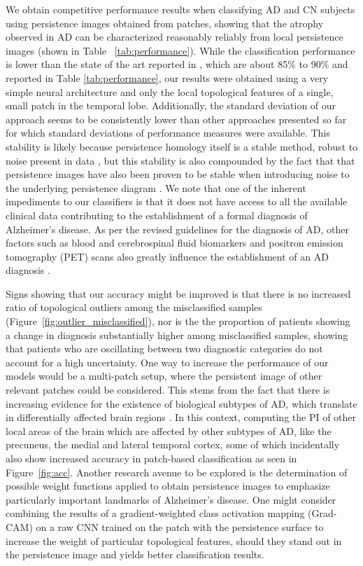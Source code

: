 \documentclass{article}
\begin{document}
We obtain competitive performance results when classifying AD and CN subjects using persistence
images obtained from patches, showing that the atrophy observed in AD can be characterized
reasonably reliably from local persistence images (shown in Table ~\ref{tab:performance}). While the
classification performance is lower than the state of the art reported in \citep{liu2018anatomical},
which are about 85\% to 90\% and reported in Table \ref{tab:performance}, our results were obtained
using a very simple neural architecture and only the local topological features of a single, small
patch in the temporal lobe. Additionally, the standard deviation of our approach seems to be
consistently lower than other approaches presented so far for which standard deviations of
performance measures were available. This stability is likely because persistence
homology itself is a stable method, robust to noise present in data \citep{cohen2007stability},
but this stability is also compounded by the fact that that persistence images have also been proven
to be stable when introducing noise to the underlying persistence diagram
\citep{adams2017persistence}. We note that one of the inherent impediments to our classifiers is that
it does not have access to all the available clinical data contributing to the establishment of
a formal diagnosis of Alzheimer's disease. As per the revised guidelines for the diagnosis of AD,
other factors such as blood and cerebrospinal fluid biomarkers and positron emission tomography
(PET) scans also greatly influence the establishment of an AD diagnosis \citep{mckhann2011diagnosis}.

Signs showing that our accuracy might be improved is that there is no increased ratio of topological
outliers among the misclassified samples (Figure~\ref{fig:outlier_misclassified}), nor is the
the proportion of patients showing a change in diagnosis substantially higher among misclassified
samples, showing that patients who are oscillating between two diagnostic categories do not account
for a high uncertainty. One way to increase the performance of our models would be a multi-patch
setup, where the persistent image of other relevant patches could be considered. This stems from the
fact that there is increasing evidence for the existence of biological subtypes of AD, which
translate in differentially affected brain regions \citep{poulakis2018heterogeneous,
tijms2020pathophysiological}. In this context, computing the PI of other local areas of the brain
which are affected by other subtypes of AD, like the precuneus, the medial and lateral temporal
cortex, some of which incidentally also show increased accuracy in patch-based classification as
seen in Figure~\ref{fig:acc}. Another research avenue to be explored is the determination of
possible weight functions applied to obtain persistence images to emphasize particularly important
landmarks of Alzheimer's disease. One might consider combining the results of a gradient-weighted
class activation mapping (Grad-CAM) on a raw CNN trained on the patch with the persistence surface
to increase the weight of particular topological features, should they stand out in the persistence
image and yields better classification results.
\end{document}
